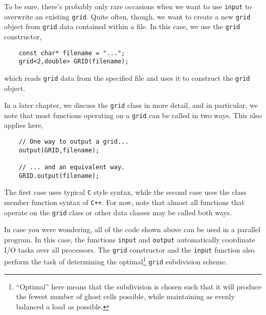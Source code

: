 To be sure, there's probably only rare occasions when we want to use {\tt input} to overwrite an existing {\tt grid}.  Quite often, though, we want to create a new {\tt grid} object from {\tt grid} data contained within a file.  In this case, we use the {\tt grid} constructor,
\begin{shadebox}
\begin{verbatim}
    const char* filename = "...";
    grid<2,double> GRID(filename);
\end{verbatim}
\end{shadebox}
which reads {\tt grid} data from the specified file and uses it to construct the {\tt grid} object.

In a later chapter, we discuss the {\tt grid} class in more detail, and in particular, we note that most functions operating on a {\tt grid} can be called in two ways.  This also applies here,
\begin{shadebox}
\begin{verbatim}
    // One way to output a grid...
    output(GRID,filename);

    // ... and an equivalent way.
    GRID.output(filename);
\end{verbatim}
\end{shadebox}
The first case uses typical {\tt C} style syntax, while the second case uses the class member function syntax of {\tt C++}.  For now, note that almost all functions that operate on the {\tt grid} class or other \MMSP data classes may be called both ways.

In case you were wondering, all of the code shown above can be used in a parallel program.  In this case, the functions {\tt input} and {\tt output} automatically coordinate I/O tasks over all processors.  The {\tt grid} constructor and the {\tt input} function also perform the task of determining the optimal\footnote{``Optimal'' here means that the subdivision is chosen such that it will produce the fewest number of ghost cells possible, while maintaining as evenly balanced a load as possible.} {\tt grid} subdivision scheme.  


